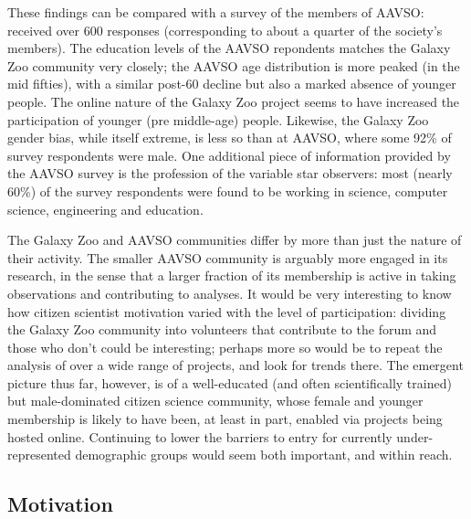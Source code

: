 \documentclass{ar2e}
\begin{document}
These findings can be compared with a survey of the members of AAVSO:
\citet{P+P2012} received over 600 responses (corresponding to about a quarter
of the society's members). The education levels of
the AAVSO repondents matches the Galaxy Zoo community very closely; the AAVSO
age distribution is more peaked (in the mid fifties), with a similar post-60
decline but also a marked absence of younger people. The online nature of the
Galaxy Zoo project seems to have increased the participation of younger (pre
middle-age) people. Likewise, the Galaxy Zoo gender bias, while itself
extreme, is less so than at AAVSO, where some 92\% of survey respondents were
male. One additional piece of information provided by the AAVSO survey is the
profession of the variable star observers: most (nearly 60\%) of the survey
respondents were found to be working in science, computer science, engineering
and education. 

The Galaxy Zoo and AAVSO communities differ by more than just the nature of
their activity. The smaller AAVSO community is arguably more engaged in its
research, in the sense that a larger fraction of its membership is active in
taking observations and contributing to analyses. It would be very interesting
to know how citizen scientist motivation varied with the level of
participation: dividing the Galaxy Zoo community into volunteers that
contribute to the  forum and those who don't could be interesting; perhaps
more so would be to repeat the analysis of \citeauthor{Rad++2013} over a wide
range of projects, and look for trends there. The emergent picture thus far,
however, is of a well-educated (and often scientifically trained)  but
male-dominated citizen science community, whose female and younger membership
is likely to have been, at least in part, enabled via projects being hosted
online. Continuing to lower the barriers to entry for currently
under-represented demographic groups would seem both important, and within
reach.



\subsection{Motivation}
\label{sec:crowd:motivation}

\end{document}
